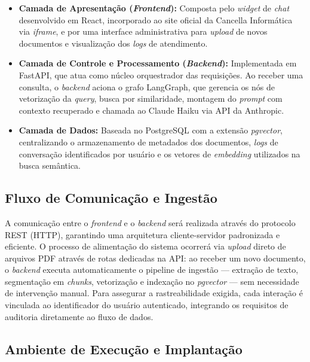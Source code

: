 \documentclass[a4paper,12pt,Times]{article}
\begin{document}
\begin{itemize}
    \item \textbf{Camada de Apresentação (\textit{Frontend}):} Composta pelo \textit{widget}
          de \textit{chat} desenvolvido em React, incorporado ao site oficial da Cancella
          Informática via \textit{iframe}, e por uma interface administrativa para
          \textit{upload} de novos documentos e visualização dos \textit{logs} de
          atendimento.
    \item \textbf{Camada de Controle e Processamento (\textit{Backend}):} Implementada em
          FastAPI, que atua como núcleo orquestrador das requisições. Ao receber uma
          consulta, o \textit{backend} aciona o grafo LangGraph, que gerencia os nós de
          vetorização da \textit{query}, busca por similaridade, montagem do \textit{prompt}
          com contexto recuperado e chamada ao Claude Haiku via API da Anthropic.
    \item \textbf{Camada de Dados:} Baseada no PostgreSQL com a extensão \textit{pgvector},
          centralizando o armazenamento de metadados dos documentos, \textit{logs} de
          conversação identificados por usuário e os vetores de \textit{embedding}
          utilizados na busca semântica.
\end{itemize}

\subsection{Fluxo de Comunicação e Ingestão}

A comunicação entre o \textit{frontend} e o \textit{backend} será realizada através do
protocolo REST (HTTP), garantindo uma arquitetura cliente-servidor padronizada e eficiente.
O processo de alimentação do sistema ocorrerá via \textit{upload} direto de arquivos PDF
através de rotas dedicadas na API: ao receber um novo documento, o \textit{backend}
executa automaticamente o pipeline de ingestão — extração de texto, segmentação em
\textit{chunks}, vetorização e indexação no \textit{pgvector} — sem necessidade de
intervenção manual. Para assegurar a rastreabilidade exigida, cada interação é vinculada
ao identificador do usuário autenticado, integrando os requisitos de auditoria diretamente
ao fluxo de dados.

\subsection{Ambiente de Execução e Implantação}
\end{document}
